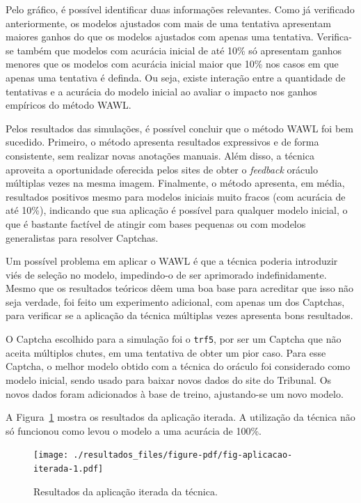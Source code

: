 \documentclass[12pt,twoside,brazilian]{book}
\begin{document}
Pelo gráfico, é possível identificar duas informações relevantes. Como
já verificado anteriormente, os modelos ajustados com mais de uma
tentativa apresentam maiores ganhos do que os modelos ajustados com
apenas uma tentativa. Verifica-se também que modelos com acurácia
inicial de até 10\% só apresentam ganhos menores que os modelos com
acurácia inicial maior que 10\% nos casos em que apenas uma tentativa é
definda. Ou seja, existe interação entre a quantidade de tentativas e a
acurácia do modelo inicial ao avaliar o impacto nos ganhos empíricos do
método WAWL.

Pelos resultados das simulações, é possível concluir que o método WAWL
foi bem sucedido. Primeiro, o método apresenta resultados expressivos e
de forma consistente, sem realizar novas anotações manuais. Além disso,
a técnica aproveita a oportunidade oferecida pelos sites de obter o
\emph{feedback} oráculo múltiplas vezes na mesma imagem. Finalmente, o
método apresenta, em média, resultados positivos mesmo para modelos
iniciais muito fracos (com acurácia de até 10\%), indicando que sua
aplicação é possível para qualquer modelo inicial, o que é bastante
factível de atingir com bases pequenas ou com modelos generalistas para
resolver Captchas.

Um possível problema em aplicar o WAWL é que a técnica poderia
introduzir viés de seleção no modelo, impedindo-o de ser aprimorado
indefinidamente. Mesmo que os resultados teóricos dêem uma boa base para
acreditar que isso não seja verdade, foi feito um experimento adicional,
com apenas um dos Captchas, para verificar se a aplicação da técnica
múltiplas vezes apresenta bons resultados.

O Captcha escolhido para a simulação foi o \texttt{trf5}, por ser um
Captcha que não aceita múltiplos chutes, em uma tentativa de obter um
pior caso. Para esse Captcha, o melhor modelo obtido com a técnica do
oráculo foi considerado como modelo inicial, sendo usado para baixar
novos dados do site do Tribunal. Os novos dados foram adicionados à base
de treino, ajustando-se um novo modelo.

A Figura~\ref{fig-aplicacao-iterada} mostra os resultados da aplicação
iterada. A utilização da técnica não só funcionou como levou o modelo a
uma acurácia de 100\%.

\begin{figure}

{\centering \texttt{[image: ./resultados\_files/figure-pdf/fig-aplicacao-iterada-1.pdf]}

}

\caption{\label{fig-aplicacao-iterada}Resultados da aplicação iterada da
técnica.}

\end{figure}
\end{document}
